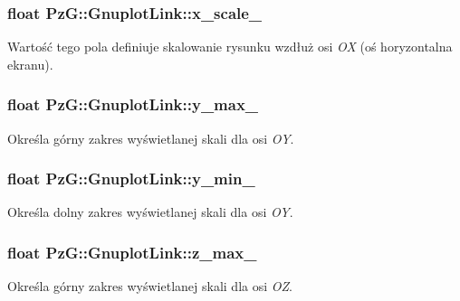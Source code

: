 \subsubsection[{\texorpdfstring{x\+\_\+scale\+\_\+}{x_scale_}}]{\setlength{\rightskip}{0pt plus 5cm}float Pz\+G\+::\+Gnuplot\+Link\+::x\+\_\+scale\+\_\+\hspace{0.3cm}{\ttfamily [protected]}}\hypertarget{class_pz_g_1_1_gnuplot_link_a725cf4ed098148a0e9b10ed94023757a}{}\label{class_pz_g_1_1_gnuplot_link_a725cf4ed098148a0e9b10ed94023757a}
Wartość tego pola definiuje skalowanie rysunku wzdłuż osi {\itshape OX} (oś horyzontalna ekranu). 
\subsubsection[{\texorpdfstring{y\+\_\+max\+\_\+}{y_max_}}]{\setlength{\rightskip}{0pt plus 5cm}float Pz\+G\+::\+Gnuplot\+Link\+::y\+\_\+max\+\_\+\hspace{0.3cm}{\ttfamily [protected]}}\hypertarget{class_pz_g_1_1_gnuplot_link_a9fb5609ee05da82c3a5c9f94416c1ac1}{}\label{class_pz_g_1_1_gnuplot_link_a9fb5609ee05da82c3a5c9f94416c1ac1}
Określa górny zakres wyświetlanej skali dla osi {\itshape OY}. 
\subsubsection[{\texorpdfstring{y\+\_\+min\+\_\+}{y_min_}}]{\setlength{\rightskip}{0pt plus 5cm}float Pz\+G\+::\+Gnuplot\+Link\+::y\+\_\+min\+\_\+\hspace{0.3cm}{\ttfamily [protected]}}\hypertarget{class_pz_g_1_1_gnuplot_link_a31c8d2fcb350d54d09134c0f0a838aea}{}\label{class_pz_g_1_1_gnuplot_link_a31c8d2fcb350d54d09134c0f0a838aea}
Określa dolny zakres wyświetlanej skali dla osi {\itshape OY}. 
\subsubsection[{\texorpdfstring{z\+\_\+max\+\_\+}{z_max_}}]{\setlength{\rightskip}{0pt plus 5cm}float Pz\+G\+::\+Gnuplot\+Link\+::z\+\_\+max\+\_\+\hspace{0.3cm}{\ttfamily [protected]}}\hypertarget{class_pz_g_1_1_gnuplot_link_ad16243c88647f80c0f69a6d04021dbf7}{}\label{class_pz_g_1_1_gnuplot_link_ad16243c88647f80c0f69a6d04021dbf7}
Określa górny zakres wyświetlanej skali dla osi {\itshape OZ}. 
